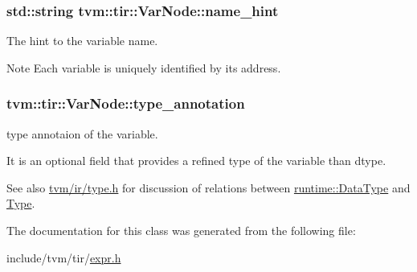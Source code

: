 \subsubsection[{\texorpdfstring{name\+\_\+hint}{name_hint}}]{\setlength{\rightskip}{0pt plus 5cm}std\+::string tvm\+::tir\+::\+Var\+Node\+::name\+\_\+hint}\hypertarget{classtvm_1_1tir_1_1VarNode_ac09a97d7c89f6d50b2a8f198e0917dce}{}\label{classtvm_1_1tir_1_1VarNode_ac09a97d7c89f6d50b2a8f198e0917dce}


The hint to the variable name. 

\begin{DoxyNote}{Note}
Each variable is uniquely identified by its address. 
\end{DoxyNote}
\subsubsection[{\texorpdfstring{type\+\_\+annotation}{type_annotation}}]{ tvm\+::tir\+::\+Var\+Node\+::type\+\_\+annotation}\hypertarget{classtvm_1_1tir_1_1VarNode_a7a84c6d137a79e9a5b9c4b6183f18353}{}\label{classtvm_1_1tir_1_1VarNode_a7a84c6d137a79e9a5b9c4b6183f18353}


type annotaion of the variable. 

It is an optional field that provides a refined type of the variable than dtype.

\begin{DoxySeeAlso}{See also}
\hyperlink{ir_2type_8h}{tvm/ir/type.\+h} for discussion of relations between \hyperlink{classtvm_1_1runtime_1_1DataType}{runtime\+::\+Data\+Type} and \hyperlink{classtvm_1_1Type}{Type}. 
\end{DoxySeeAlso}


The documentation for this class was generated from the following file\+:\begin{DoxyCompactItemize}
\item 
include/tvm/tir/\hyperlink{tir_2expr_8h}{expr.\+h}\end{DoxyCompactItemize}
